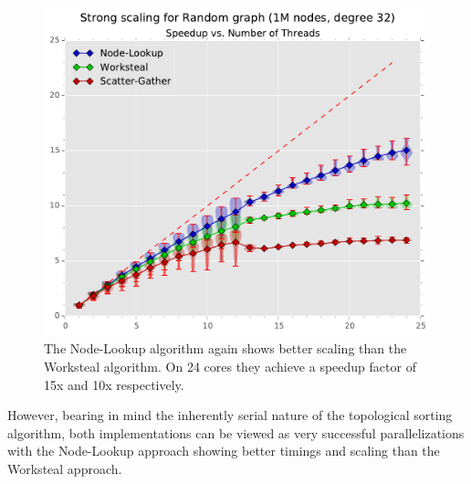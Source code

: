 %
\begin{figure}[ht]
	\centering
	\includegraphics[width=\columnwidth]{plots/strongscaling_gtRANDOMLIN_n1000000_deg32.pdf}
	\caption{The Node-Lookup algorithm again shows better scaling than the Worksteal algorithm. On 24 cores they achieve a speedup factor of 15x and 10x respectively.}
	\label{fig:strongscaling}
\end{figure}
%
However, bearing in mind the inherently serial nature of the topological sorting algorithm, both implementations can be viewed as very successful parallelizations with the Node-Lookup approach showing better timings and scaling than the Worksteal approach.



